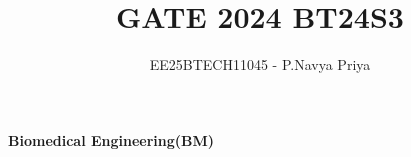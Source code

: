 \documentclass[a4paper,12pt]{exam}
\renewcommand{\thefigure}{\theenumi}
\renewcommand{\thetable}{\theenumi}
\numberwithin{equation}{enumi}
\numberwithin{figure}{enumi}
\renewcommand{\thetable}{\theenumi}
\begin{document}

\vspace{-2cm}
\title{GATE 2024 BT24S3}
\author{EE25BTECH11045 - P.Navya Priya}

{\let\newpage\relax\maketitle}
\renewcommand{\thefigure}{\theenumi}
\renewcommand{\thetable}{\theenumi}

\vspace*{-1.5cm}
\begin{flushright}
\textbf{Biomedical Engineering(BM)}
\end{flushright}

\vspace{2cm}


\vspace{-1cm}
\vspace{0.75cm}
\end{document}
